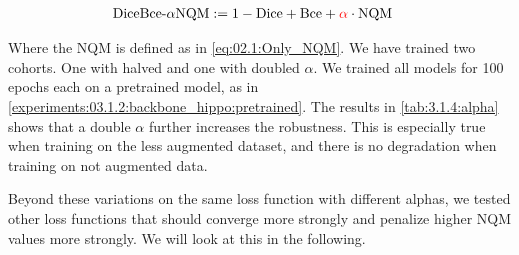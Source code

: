 \begin{align}
    \text{DiceBce-$\alpha$NQM} &:= 1 - \mathrm{Dice} + \mathrm{Bce} + {\color{red}\alpha}\cdot\mathrm{NQM}
\end{align}

Where the NQM is defined as in \autoref{eq:02.1:Only_NQM}. We have trained two cohorts. One with halved and one with doubled $\alpha$. We trained all models for 100 epochs each on a pretrained model, as in \autoref{experiments:03.1.2:backbone_hippo:pretrained}. The results in \autoref{tab:3.1.4:alpha} shows that a double $\alpha$ further increases the robustness. This is especially true when training on the less augmented dataset, and there is no degradation when training on not augmented data.

Beyond these variations on the same loss function with different alphas, we tested other loss functions that should converge more strongly and penalize higher NQM values more strongly. We will look at this in the following.
\iffalse

\fi